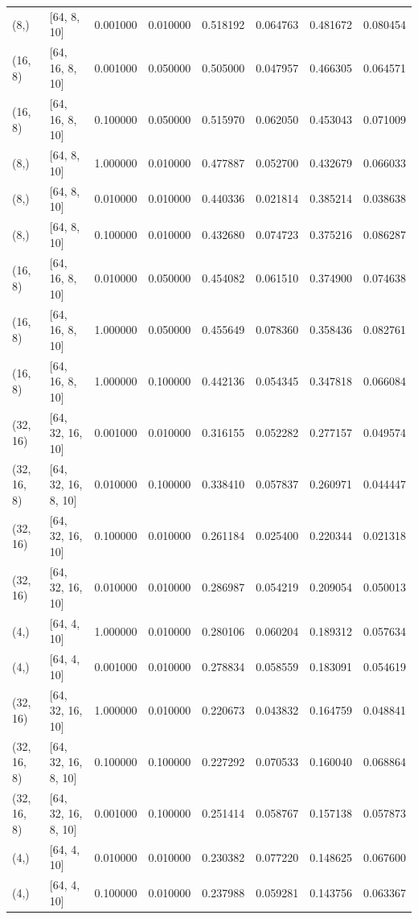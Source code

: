 \begin{tabular}{llrrrrrr}
(8,) & [64, 8, 10] & 0.001000 & 0.010000 & 0.518192 & 0.064763 & 0.481672 & 0.080454 \\
(16, 8) & [64, 16, 8, 10] & 0.001000 & 0.050000 & 0.505000 & 0.047957 & 0.466305 & 0.064571 \\
(16, 8) & [64, 16, 8, 10] & 0.100000 & 0.050000 & 0.515970 & 0.062050 & 0.453043 & 0.071009 \\
(8,) & [64, 8, 10] & 1.000000 & 0.010000 & 0.477887 & 0.052700 & 0.432679 & 0.066033 \\
(8,) & [64, 8, 10] & 0.010000 & 0.010000 & 0.440336 & 0.021814 & 0.385214 & 0.038638 \\
(8,) & [64, 8, 10] & 0.100000 & 0.010000 & 0.432680 & 0.074723 & 0.375216 & 0.086287 \\
(16, 8) & [64, 16, 8, 10] & 0.010000 & 0.050000 & 0.454082 & 0.061510 & 0.374900 & 0.074638 \\
(16, 8) & [64, 16, 8, 10] & 1.000000 & 0.050000 & 0.455649 & 0.078360 & 0.358436 & 0.082761 \\
(16, 8) & [64, 16, 8, 10] & 1.000000 & 0.100000 & 0.442136 & 0.054345 & 0.347818 & 0.066084 \\
(32, 16) & [64, 32, 16, 10] & 0.001000 & 0.010000 & 0.316155 & 0.052282 & 0.277157 & 0.049574 \\
(32, 16, 8) & [64, 32, 16, 8, 10] & 0.010000 & 0.100000 & 0.338410 & 0.057837 & 0.260971 & 0.044447 \\
(32, 16) & [64, 32, 16, 10] & 0.100000 & 0.010000 & 0.261184 & 0.025400 & 0.220344 & 0.021318 \\
(32, 16) & [64, 32, 16, 10] & 0.010000 & 0.010000 & 0.286987 & 0.054219 & 0.209054 & 0.050013 \\
(4,) & [64, 4, 10] & 1.000000 & 0.010000 & 0.280106 & 0.060204 & 0.189312 & 0.057634 \\
(4,) & [64, 4, 10] & 0.001000 & 0.010000 & 0.278834 & 0.058559 & 0.183091 & 0.054619 \\
(32, 16) & [64, 32, 16, 10] & 1.000000 & 0.010000 & 0.220673 & 0.043832 & 0.164759 & 0.048841 \\
(32, 16, 8) & [64, 32, 16, 8, 10] & 0.100000 & 0.100000 & 0.227292 & 0.070533 & 0.160040 & 0.068864 \\
(32, 16, 8) & [64, 32, 16, 8, 10] & 0.001000 & 0.100000 & 0.251414 & 0.058767 & 0.157138 & 0.057873 \\
(4,) & [64, 4, 10] & 0.010000 & 0.010000 & 0.230382 & 0.077220 & 0.148625 & 0.067600 \\
(4,) & [64, 4, 10] & 0.100000 & 0.010000 & 0.237988 & 0.059281 & 0.143756 & 0.063367 \\

\end{tabular}
